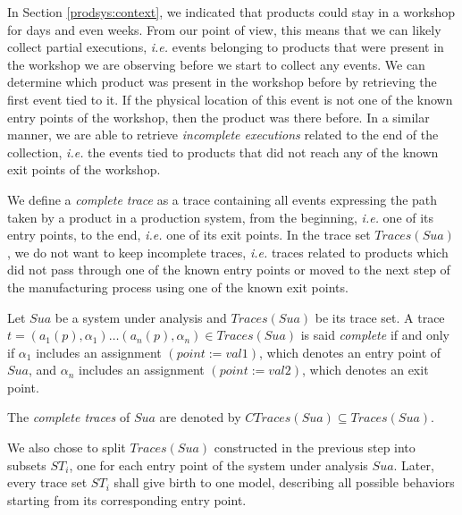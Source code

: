 In Section \ref{prodsys:context}, we indicated that products
could stay in a workshop for days and even weeks. From our point
of view, this means that we can likely collect partial
executions, \emph{i.e.} events belonging to products that were present
in the workshop we are observing before we start to collect any
events. We can determine which product was present in the
workshop before by retrieving the first event tied to it.
If the physical location of this event is not one of the known
entry points of the workshop, then the product was there before.
In a similar manner, we are able to retrieve \emph{incomplete
executions} related to the end of the collection, \emph{i.e.} the
events tied to products that did not reach any of the known exit
points of the workshop.

We define a \textit{complete trace} as a trace containing all
events expressing the path taken by a product in a production
system, from the beginning, \emph{i.e.} one of its entry points,
to the end, \emph{i.e.} one of its exit points. In the trace set
$Traces(Sua)$, we do not want to keep incomplete traces,
\emph{i.e.}  traces related to products which did not pass
through one of the known entry points or moved to the next step
of the manufacturing process using one of the known exit points.

\begin{definition}
    Let $\mathit{Sua}$ be a system under analysis and
    $Traces({Sua})$ be its trace set. A trace $t=(a_1(p), \alpha_1)
    \dots (a_n(p), \alpha_n) \in Traces({Sua})$ is said
    \emph{complete} if and only if $\alpha_1$ includes an
    assignment $(point:=val1)$, which denotes an entry point of
    $\mathit{Sua}$, and $\alpha_n$ includes an assignment
    $(point:=val2)$, which denotes an exit point.

    The \emph{complete traces} of $\mathit{Sua}$ are denoted by
    $CTraces({Sua}) \subseteq Traces({Sua})$.
\end{definition}

We also chose to split $Traces(Sua)$ constructed in the previous step
into subsets $ST_i$, one for each entry point of the system under
analysis $\mathit{Sua}$. Later, every trace set $ST_i$ shall give
birth to one model, describing all possible behaviors starting
from its corresponding entry point.

